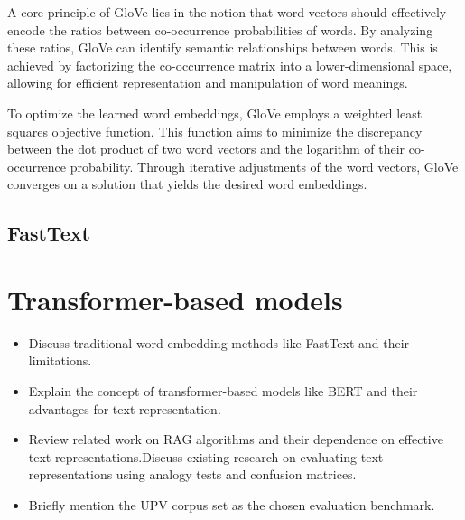 A core principle of \ac{GloVe} lies in the notion that word vectors should effectively encode the ratios between co-occurrence probabilities of words.
By analyzing these ratios, \ac{GloVe} can identify semantic relationships between words.
This is achieved by factorizing the co-occurrence matrix into a lower-dimensional space, allowing for efficient representation and manipulation of word meanings.

To optimize the learned word embeddings, \ac{GloVe} employs a weighted least squares objective function.
This function aims to minimize the discrepancy between the dot product of two word vectors and the logarithm of their co-occurrence probability.
Through iterative adjustments of the word vectors, \ac{GloVe} converges on a solution that yields the desired word embeddings.


\subsection{FastText \cite{fasttext}}


\section{Transformer-based models}


\begin{itemize}
    \item Discuss traditional word embedding methods like FastText and their limitations.
    \item Explain the concept of transformer-based models like BERT and their advantages for text representation.
    \item Review related work on RAG algorithms and their dependence on effective text representations.Discuss existing research on evaluating text representations using analogy tests and confusion matrices.
    \item Briefly mention the UPV corpus set as the chosen evaluation benchmark.
\end{itemize}